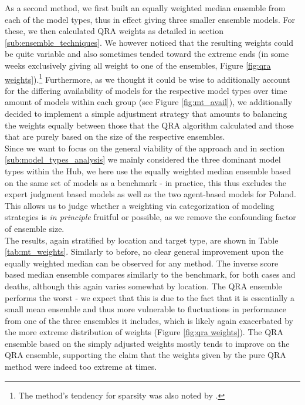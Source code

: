 As a second method, we first built an equally weighted median ensemble from each of the model types, thus in effect giving three smaller ensemble models. For these, we then calculated QRA weights as detailed in section \ref{sub:ensemble_techniques}. We however noticed that the resulting weights could be quite variable and also sometimes tended toward the extreme ends (in some weeks exclusively giving all weight to one of the ensembles, Figure \ref{fig:qra weights}).\footnote{The method's tendency for sparsity was also noted by \cite{ray_challenges_2021}.} Furthermore, as we thought it could be wise to additionally account for the differing availability of models for the respective model types over time amount of models within each group (see Figure \ref{fig:mt_avail}), we additionally decided to implement a simple adjustment strategy that amounts to balancing the weights equally between those that the QRA algorithm calculated and those that are purely based on the size of the respective ensembles.\\
Since we want to focus on the general viability of the approach and in section \ref{sub:model_types_analysis} we mainly considered the three dominant model types within the Hub, we here use the equally weighted median ensemble based on the same set of models as a benchmark - in practice, this thus excludes the expert judgment based models as well as the two agent-based models for Poland. This allows us to judge whether a weighting via categorization of modeling strategies is \textit{in principle} fruitful or possible, as we remove the confounding factor of ensemble size.\\ %
The results, again stratified by location and target type, are shown in Table \ref{tab:mt_weights}. Similarly to before, no clear general improvement upon the equally weighted median can be observed for any method. The inverse score based median ensemble compares similarly to the benchmark, for both cases and deaths, although this again varies somewhat by location. The QRA ensemble performs the worst - we expect that this is due to the fact that it is essentially a small mean ensemble and thus more vulnerable to fluctuations in performance from one of the three ensembles it includes, which is likely again exacerbated by the more extreme distribution of weights (Figure \ref{fig:qra weights}). The QRA ensemble based on the simply adjusted weights mostly tends to improve on the QRA ensemble, supporting the claim that the weights given by the pure QRA method were indeed too extreme at times.\\ 
